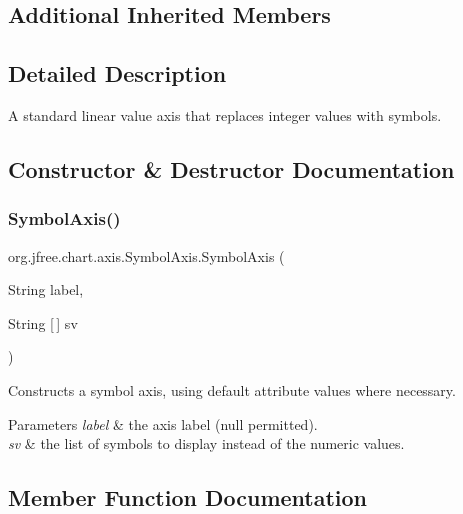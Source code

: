 \subsection*{Additional Inherited Members}


\subsection{Detailed Description}
A standard linear value axis that replaces integer values with symbols. 

\subsection{Constructor \& Destructor Documentation}
\mbox{\label{classorg_1_1jfree_1_1chart_1_1axis_1_1_symbol_axis_aa462a9c4532d3de2ffa0bf0e7f32c34d}} 
\subsubsection{\texorpdfstring{Symbol\+Axis()}{SymbolAxis()}}
{\footnotesize\ttfamily org.\+jfree.\+chart.\+axis.\+Symbol\+Axis.\+Symbol\+Axis (\begin{DoxyParamCaption}\item[{String}]{label,  }\item[{String \mbox{[}$\,$\mbox{]}}]{sv }\end{DoxyParamCaption})}

Constructs a symbol axis, using default attribute values where necessary.


\begin{DoxyParams}{Parameters}
{\em label} & the axis label ({\ttfamily null} permitted). \\
\hline
{\em sv} & the list of symbols to display instead of the numeric values. \\
\hline
\end{DoxyParams}


\subsection{Member Function Documentation}
\mbox{\label{classorg_1_1jfree_1_1chart_1_1axis_1_1_symbol_axis_ab10024e0bf1a48fcda4d362c04f28aa4}} 

